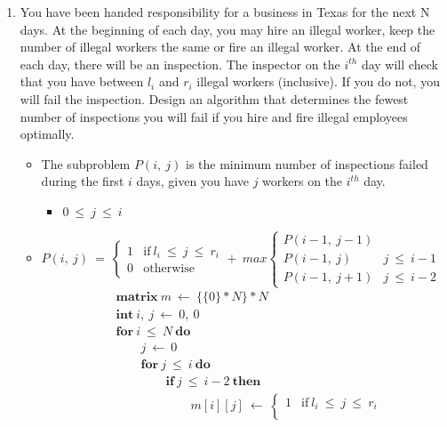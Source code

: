 \documentclass[a4paper]{article}
\begin{document}
\begin{enumerate}
				\clearpage
				\item You have been handed responsibility for a business in Texas for the next N days. At the beginning of each day, you may hire an illegal worker, keep the number of illegal workers the same or fire an illegal worker. At the end of each day, there will be an inspection. The inspector on the $i^{th}$ day will check that you have between $l_i$ and $r_i$ illegal workers (inclusive). If you do not, you will fail the inspection. Design an algorithm that determines the fewest number of inspections you will fail if you hire and fire illegal employees optimally.
						\begin{itemize}
								\item The subproblem $P(i,\ j)$ is the minimum number of inspections failed during the first $i$ days, given you have $j$ workers on the $i^{th}$ day. 
										\begin{itemize}
												\item $0\ \leq\ j\ \leq\ i$
										\end{itemize}
												\item $P(i,\ j)\ =\ 
														\begin{cases}
																1 & \text{if}\ l_i\ \leq\ j\ \leq\ r_i \\
																0 & \text{otherwise}
														\end{cases} +\ \textit{max} 
														\begin{cases}
																P(i-1,\ j-1) & \\
																P(i-1,\ j) & j\ \leq\ i-1 \\
																P(i-1,\ j+1) & j\ \leq\ i-2
														\end{cases}$
														\begin{align*}
																&\textbf{matrix}\ m\ \gets\ \{\{0\}*N\}*N \\
																&\textbf{int}\ i,\ j\ \gets\ 0,\ 0 \\
																&\textbf{for}\ i\ \leq\ N\ \textbf{do} \\
																&\qquad j\ \gets\ 0 \\
																&\qquad\textbf{for}\ j\ \leq\ i\ \textbf{do} \\
																&\qquad\qquad\textbf{if}\ j\ \leq\ i-2\ \textbf{then} \\
																&\qquad\qquad\qquad m[i][j]\ \gets\ 
																\begin{cases}
																		1 & \text{if}\ l_i\ \leq\ j\ \leq\ r_i \\

\end{cases}
\end{align*}
\end{itemize}
\end{enumerate}
\end{document}
